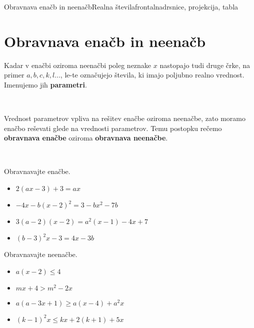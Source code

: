 \begin{priprava}{17}{}{Obravnava enačb in neenačb}{Realna števila}{frontalna}{drsnice, projekcija, tabla}
    
    \section{Obravnava enačb in neenačb}

        

            
            Kadar v enačbi oziroma neenačbi poleg neznake $x$ nastopajo tudi druge črke, na primer $a, b, c, k, l ...$, 
            le-te označujejo števila, ki imajo poljubno realno vrednost. Imenujemo jih \textbf{parametri}.

~
            
            Vrednost parametrov vpliva na rešitev enačbe oziroma neenačbe, zato moramo enačbo reševati glede na vrednosti parametrov.
            Temu postopku rečemo \textbf{obravnava enačbe} oziroma \textbf{obravnava neenačbe}.

        

~~~

        
            \begin{naloga}
                Obravnavajte enačbe.
                \begin{itemize}
                        \item $2(ax-3)+3=ax$ 
                        \item $-4x-b(x-2)^2=3-bx^2-7b$ 
                        \item $3(a-2)(x-2)=a^2(x-1)-4x+7$ 
                        \item $(b-3)^2x-3=4x-3b$ 
                \end{itemize}
            \end{naloga}
        

        
            \begin{naloga}
                Obravnavajte neenačbe.
                \begin{itemize}
                        \item $a(x-2)\leq 4$ 
                        \item $mx+4>m^2-2x$ 
                        \item $a(a-3x+1)\geq a(x-4)+a^2x$ 
                        \item $(k-1)^2x\leq kx+2(k+1)+5x$ 
                \end{itemize}
            \end{naloga}

    
\end{priprava}